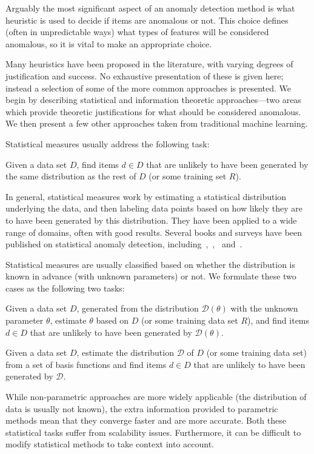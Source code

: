Arguably the most significant aspect of an anomaly detection method is what heuristic is used to decide if items are anomalous or not. This choice defines (often in unpredictable ways) what types of features will be considered anomalous, so it is vital to make an appropriate choice.

Many heuristics have been proposed in the literature, with varying degrees of justification and success. No exhaustive presentation of these is given here; instead a selection of some of the more common approaches is presented. We begin by describing statistical and information theoretic approaches---two areas which provide theoretic justifications for what should be considered anomalous. We then present a few other approaches taken from traditional machine learning.

Statistical measures usually address the following task:
\begin{task}
\label{task:statistical}
  Given a data set $D$, find items $d \in D$ that are unlikely to have been generated by the same distribution as the rest of $D$ (or some training set $R$).
\end{task}
In general, statistical measures work by estimating a statistical distribution underlying the data, and then labeling data points based on how likely they are to have been generated by this distribution. They have been applied to a wide range of domains, often with good results. Several books and surveys have been published on statistical anomaly detection, including~\cite{barnett},~\cite{bakar},~\cite{leroy} and~\cite{hawkins}.

Statistical measures are usually classified based on whether the distribution is known in advance (with unknown parameters) or not. We formulate these two cases as the following two tasks:
\begin{task}
  Given a data set $D$, generated from the distribution $\mathcal{D}(\theta)$ with the unknown parameter $\theta$, estimate $\theta$ based on $D$ (or some training data set $R$), and find items $d \in D$ that are unlikely to have been generated by $\mathcal{D}(\theta)$.
\end{task}
\begin{task}
  Given a data set $D$, estimate the distribution $\mathcal{D}$ of $D$ (or some training data set) from a set of basis functions and find items $d \in D$ that are unlikely to have been generated by $\mathcal{D}$.
\end{task}
While non-parametric approaches are more widely applicable (the distribution of data is usually not known), the extra information provided to parametric methods mean that they converge faster and are more accurate. Both these statistical tasks suffer from scalability issues. Furthermore, it can be difficult to modify statistical methods to take context into account.

